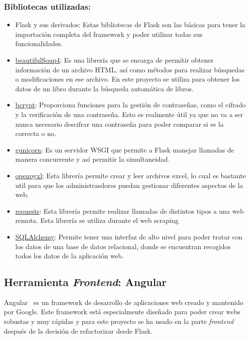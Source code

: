  \subsubsection{Bibliotecas utilizadas:}

 \begin{itemize}
     \item Flask y sus derivados:
     Estas bibliotecas de Flask son las básicas para tener la importación completa del framework y poder utilizar todas sus funcionalidades. 
     \item \href{https://beautiful-soup-4.readthedocs.io/en/latest/}{beautifulSoup4}: 
     Es una librería que se encarga de permitir obtener información de un archivo HTML, así como métodos para realizar búsquedas o modificaciones en ese archivo. En este proyecto se utiliza para obtener los datos de un libro durante la búsqueda automática de libros.
     \item \href{https://pypi.org/project/bcrypt/}{bcrypt}:
     Proporciona funciones para la gestión de contraseñas, como el cifrado y la verificación de una contraseña. Esto es realmente útil ya que no va a ser nunca necesario descifrar una contraseña para poder comparar si es la correcta o no.
     \item \href{https://gunicorn.org/}{gunicorn}: Es un servidor WSGI que permite a Flask manejar llamadas de manera concurrente y así permitir la simultaneidad.
     \item \href{https://openpyxl.readthedocs.io/en/stable/}{openpyxl}:
     Esta librería permite crear y leer archivos excel, lo cual es bastante util para que los administrasdores puedan gestionar diferentes aspectos de la web.
     \item \href{https://requests.readthedocs.io/en/latest/}{requests}:
     Esta librería permite realizar llamadas de distintos tipos a una web remota. Esta librería se utiliza durante el web scraping 
     \item \href{https://www.sqlalchemy.org/}{SQLAlchemy}: Permite tener una interfaz de alto nivel para poder tratar con los datos de una base de datos relacional, donde se encuentran recogidos todos los datos de la aplicación web.
 \end{itemize}

\subsection{Herramienta \textit{Frontend}: Angular}
 Angular~\cite{Angular} es un framework de desarrollo de aplicaciones web creado y mantenido por Google.
 Este framework está especialmente diseñado para poder crear webs robustas y muy rápidas y para este proyecto se ha usado en la parte \textit{frontend} después de la decisión de refactorizar desde Flask.

